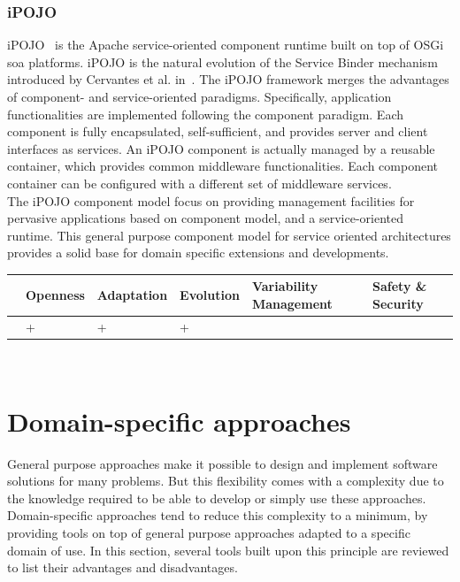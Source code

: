 \subsubsection{iPOJO}
iPOJO~\cite{Escoffier:2007} is the Apache service-oriented component runtime built on top of OSGi \gls{soa} platforms. iPOJO is the natural evolution of the Service Binder mechanism introduced by Cervantes et al. in~\cite{Cervantes:2004}. The iPOJO framework merges the advantages of component- and service-oriented paradigms. Specifically, application functionalities are implemented following the component paradigm. Each component is fully encapsulated, self-sufficient, and provides server and client interfaces as services. An iPOJO component is actually managed by a reusable container, which provides common middleware functionalities. Each component container can be configured with a different set of middleware services.\\
The iPOJO component model focus on providing management facilities for pervasive applications based on component model, and a service-oriented runtime. This general purpose component model for service oriented architectures provides a solid base for domain specific extensions and developments.
 \\
\begin{tabular}{ >{\centering}m{}| >{\centering}m{} >{\centering}m{}| >{\centering}m{} >{\centering}m{}| >{\centering\arraybackslash}m{}}
{\tiny Interoperability} & {\tiny Openness} & {\tiny Adaptation} & {\tiny Evolution} & {\tiny Variability Management} & {\tiny Safety \& Security}\\
 \hline
  & + & + & + &  & \\ 
  \hline
\end{tabular}\\


\newpage
\section{Domain-specific approaches}
\label{sec:domainSpecificApproaches}

General purpose approaches make it possible to design and implement software solutions for many problems. But this flexibility comes with a complexity due to the knowledge required to be able to develop or simply use these approaches.\\

Domain-specific approaches tend to reduce this complexity to a minimum, by providing tools on top of general purpose approaches adapted to a specific domain of use. In this section, several tools built upon this principle are reviewed to list their advantages and disadvantages.

